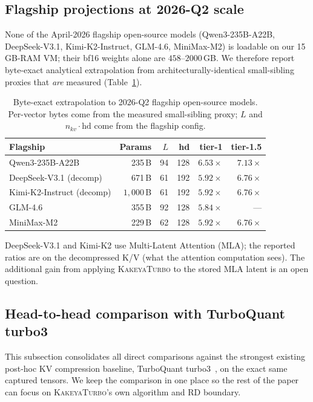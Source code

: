 \documentclass[11pt,a4paper]{article}
\theoremstyle{definition}
\theoremstyle{plain}
\begin{document}
\subsection{Flagship projections at 2026-Q2 scale}

None of the April-2026 flagship open-source models (Qwen3-235B-A22B, DeepSeek-V3.1, Kimi-K2-Instruct, GLM-4.6, MiniMax-M2) is loadable on our 15\,GB-RAM VM; their bf16 weights alone are $458$--$2000$\,GB. We therefore report byte-exact analytical extrapolation from architecturally-identical small-sibling proxies that \emph{are} measured (Table~\ref{tab:flagship}).

\begin{table}[H]
\centering
\small
\caption{Byte-exact extrapolation to 2026-Q2 flagship open-source models. Per-vector bytes come from the measured small-sibling proxy; $L$ and $n_{kv} \cdot \text{hd}$ come from the flagship config.}
\label{tab:flagship}
\begin{tabular}{lrrrrr}
  \toprule
  Flagship & Params & $L$ & hd & tier-1 & tier-1.5 \\
  \midrule
  Qwen3-235B-A22B           & 235\,B & 94 & 128 & $6.53\times$ & $\mathbf{7.13\times}$ \\
  DeepSeek-V3.1 (decomp)    & 671\,B & 61 & 192 & $5.92\times$ & $6.76\times$ \\
  Kimi-K2-Instruct (decomp) & $1{,}000$\,B & 61 & 192 & $5.92\times$ & $6.76\times$ \\
  GLM-4.6                   & 355\,B & 92 & 128 & $5.84\times$ & --- \\
  MiniMax-M2                & 229\,B & 62 & 128 & $5.92\times$ & $6.76\times$ \\
  \bottomrule
\end{tabular}
\end{table}

DeepSeek-V3.1 and Kimi-K2 use Multi-Latent Attention (MLA); the reported ratios are on the decompressed K/V (what the attention computation sees). The additional gain from applying \textsc{KakeyaTurbo} to the stored MLA latent is an open question.

\subsection{Head-to-head comparison with TurboQuant turbo3}
\label{sec:benchmark-vs-turboquant}

This subsection consolidates all direct comparisons against the strongest existing post-hoc KV compression baseline, TurboQuant turbo3~\cite{turboquant}, on the exact same captured tensors. We keep the comparison in one place so the rest of the paper can focus on \textsc{KakeyaTurbo}'s own algorithm and RD boundary.
\end{document}
